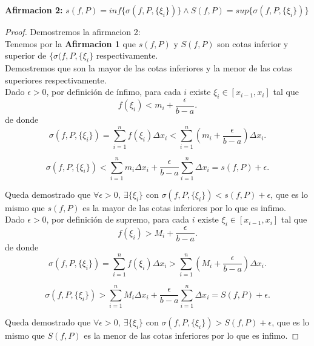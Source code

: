 \documentclass{article}
\begin{document}
\textbf{Afirmacion 2:} \(s(f, P) = inf\{\sigma(f, P,\{\xi_i\})\} \wedge S(f, P) = sup\{\sigma(f, P,\{\xi_i\})\}\)
\begin{proof}
Demostremos la afirmacion 2:\\

Tenemos por la \textbf{Afirmacion 1} que \(s(f, P)\) y \(S(f,P)\) son cotas inferior y superior de \(\{\sigma(f, P,\{\xi_i\}\) respectivamente.\\

 Demostremos que son la mayor de las cotas inferiores y la menor de las cotas superiores respectivamente.\\

Dado \(\epsilon > 0\), por definición de ínfimo, para cada \(i\) existe \(\xi_i \in [x_{i-1}, x_i]\) tal que
\[
f(\xi_i) < m_i + \frac{\epsilon}{b - a}.
\]
de donde
\[
\sigma(f, P, \{\xi_i\}) = \sum_{i=1}^n f(\xi_i) \Delta x_i < \sum_{i=1}^n \left(m_i + \frac{\epsilon}{b - a}\right) \Delta x_i.
\]

\[
\sigma(f, P, \{\xi_i\}) < \sum_{i=1}^n m_i \Delta x_i+ \frac{\epsilon}{b - a} \sum_{i=1}^n \Delta x_i = s(f, P) + \epsilon.
\]

Queda demostrado que 
   \( \forall \epsilon > 0,\ \exists \{\xi_i\} \) con \( \sigma(f, P, \{\xi_i\}) < s(f, P) + \epsilon \), que es lo mismo que \(s(f, P)\) es la mayor de las cotas inferiores por lo que es infimo.\\

Dado \(\epsilon > 0\), por definición de supremo, para cada \(i\) existe \(\xi_i \in [x_{i-1}, x_i]\) tal que
\[
f(\xi_i) > M_i + \frac{\epsilon}{b - a}.
\]
de donde
\[
\sigma(f, P, \{\xi_i\}) = \sum_{i=1}^n f(\xi_i) \Delta x_i > \sum_{i=1}^n \left(M_i + \frac{\epsilon}{b - a}\right) \Delta x_i.
\]

\[
\sigma(f, P, \{\xi_i\}) > \sum_{i=1}^n M_i \Delta x_i+ \frac{\epsilon}{b - a} \sum_{i=1}^n \Delta x_i = S(f, P) + \epsilon.
\]

Queda demostrado que 
   \( \forall \epsilon > 0,\ \exists \{\xi_i\} \) con \( \sigma(f, P, \{\xi_i\}) > S(f, P) + \epsilon \), que es lo mismo que \(S(f, P)\) es la menor de las cotas inferiores por lo que es infimo.




\end{proof}
\end{document}
